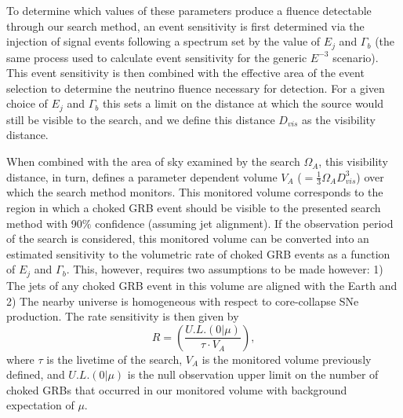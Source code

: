 \documentclass[manuscript]{aastex}
\begin{document}
To determine which values of these parameters produce a fluence detectable through our search method, an event sensitivity is first determined via the injection of signal events following a spectrum set by the value of $E_j$ and $\Gamma_b$ (the same process used to calculate event sensitivity for the generic $E^{-3}$ scenario). This event sensitivity is then combined with the effective area of the event selection to determine the neutrino fluence necessary for detection. For a given choice of $E_j$ and $\Gamma_b$ this sets a limit on the distance at which the source would still be visible to the search, and we define this distance $D_{vis}$ as the visibility distance.

When combined with the area of sky examined by the search $\Omega_{A}$, this visibility distance, in turn, defines a parameter dependent volume $V_A$ ($=\frac{1}{3}\Omega_{A}D_{vis}^{3}$) over which the search method monitors. This monitored volume corresponds to the region in which a choked GRB event should be visible to the presented search method with 90$\%$ confidence (assuming jet alignment). If the observation period of the search is considered, this monitored volume can be converted into an estimated sensitivity to the volumetric rate of choked GRB events as a function of $E_j$ and $\Gamma_b$. This, however, requires two assumptions to be made however: 1) The jets of any choked GRB event in this volume are aligned with the Earth and 2) The nearby universe is homogeneous with respect to core-collapse SNe production. The rate sensitivity is then given by
\begin{equation}\label{eq:ratelimit}
R = \left(\frac{U.L.(0|\mu)}{\tau \cdot V_A}\right),
\end{equation}
where $\tau$ is the livetime of the search, $V_A$ is the monitored volume previously defined, and $U.L.(0|\mu)$ is the null observation upper limit on the number of choked GRBs that occurred in our monitored volume with background expectation of $\mu$.
\end{document}
